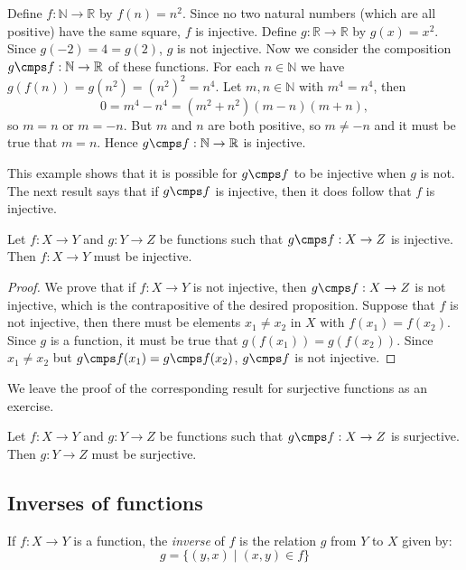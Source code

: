 \begin{example}
Define $f:\mathbb N\to\mathbb R$ by $f(n)=n^2$.  Since no two natural numbers (which are all positive) have the same square, $f$ is injective. Define $g:\mathbb R\to \mathbb R$ by $g(x)=x^2$.  Since $g(-2)=4=g(2)$, $g$ is not injective.  Now we consider the composition $g\cmps f:\mathbb N\to \mathbb R$ of these functions.  For each $n\in\mathbb N$ we have
$g(f(n))=g(n^2)=(n^2)^2=n^4$.  Let $m,n\in\mathbb N$ with $m^4=n^4$, then \[0=m^4-n^4=(m^2+n^2)(m-n)(m+n),\] so $m=n$ or $m=-n$.  But $m$ and $n$ are both positive, so $m\neq-n$ and it must be true that $m=n$. Hence $g\cmps f:\mathbb N\to\mathbb R$ is injective.
\end{example}

This example shows that it is possible for $g\cmps f$ to be injective when $g$ is not.  The next result says that if $g\cmps f$ is injective, then it does follow that $f$ is injective.

\begin{thrm}
Let $f:X\to Y$ and $g:Y\to Z$ be functions such that $g\cmps f:X\to Z$ is injective.  Then $f:X\to Y$ must be injective.
\end{thrm}

\begin{proof}
We prove that if $f:X\to Y$ is not injective, then $g\cmps f:X\to Z$ is not injective, which is the contrapositive of the desired proposition. Suppose that $f$ is not injective, then there must be elements $x_1\neq x_2$ in $X$ with $f(x_1)=f(x_2)$.  Since $g$ is a function, it must be true that $g(f(x_1))= g(f(x_2))$.  Since $x_1\neq x_2$ but $g\cmps f(x_1)=g\cmps f(x_2)$, $g\cmps f$ is not injective.
\end{proof}

We leave the proof of the corresponding result for surjective functions as an exercise.

\begin{thrm}\label{thrm:surjectivecomp}
Let $f:X\to Y$ and $g:Y\to Z$ be functions such that $g\cmps f:X\to Z$ is surjective.  Then $g:Y\to Z$ must be surjective.
\end{thrm}

\subsection{Inverses of functions}

\begin{definition}
If $f:X\to Y$ is a function, the \emph{inverse} of $f$ is the relation $g$ from $Y$ to $X$ given by:  \[g=\{(y,x)\mid (x,y)\in f\}\]
\end{definition}

